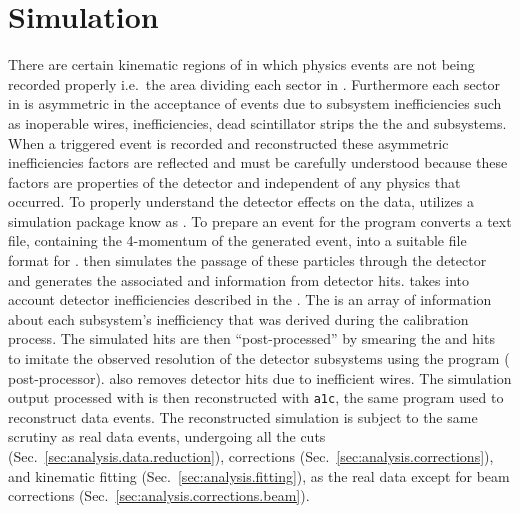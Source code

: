 \section{Simulation}\label{sec:analysis.simulation}
There are certain kinematic regions of  in which physics events are not being recorded properly i.e.~the area dividing each sector in . Furthermore each sector in  is asymmetric in the acceptance of events due to subsystem inefficiencies such as inoperable  wires,  inefficiencies, dead scintillator strips the the  and  subsystems. When a triggered event is recorded and reconstructed these asymmetric inefficiencies factors are reflected and must be carefully understood because these factors are properties of the  detector and independent of any physics that occurred. To properly understand the detector effects on the data,  utilizes a  simulation package know as . To prepare an event for  the program  converts a text file, containing the 4-momentum of the generated event, into a suitable file format for .  then simulates the passage of these particles through the  detector and generates the associated  and  information from detector hits.  takes into account detector inefficiencies described in the . The  is an array of information about each subsystem's inefficiency that was derived during the  calibration process. The  simulated hits are then ``post-processed'' by smearing the  and  hits to imitate the observed resolution of the detector subsystems using the program  ( post-processor).  also removes detector hits due to inefficient  wires. The simulation output processed with  is then reconstructed with \texttt{a1c}, the same program used to reconstruct data events. The reconstructed simulation is subject to the same scrutiny as real data events, undergoing all the cuts (Sec.~\ref{sec:analysis.data.reduction}), corrections (Sec.~\ref{sec:analysis.corrections}), and kinematic fitting (Sec.~\ref{sec:analysis.fitting}), as the real data except for beam corrections (Sec.~\ref{sec:analysis.corrections.beam}).



